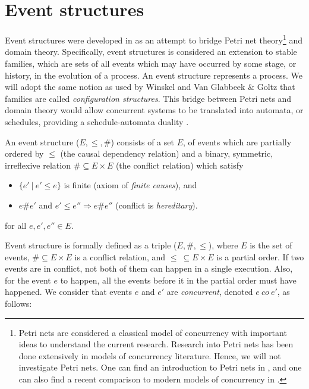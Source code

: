 \section{Event structures}
\label{sec:event-structures}
    Event structures were developed in \cite{winskel80events} as an attempt to bridge Petri net theory\footnote{Petri nets are considered a classical model of concurrency with important ideas to understand the current research. Research into Petri nets has been done extensively in models of concurrency literature. Hence, we will not investigate Petri nets. One can find an introduction to Petri nets in \cite{Petri73petrinets}, and one can also find a recent comparison to modern models of concurrency in \cite{Goubault18RelationshipsModelsForConcurrency}.} and domain theory. Specifically, event structures is considered an extension to stable families, which are sets of all events which may have occurred by some stage, or history, in the evolution of a process. An event structure represents a process. We will adopt the same notion as used by Winskel \cite{NielsenPW81eventstructures} and Van Glabbeek $\&$ Goltz \cite{GlabbeekP09configStruct} that families are called \emph{configuration structures}. This bridge between Petri nets and domain theory would allow concurrent systems to be translated into automata, or schedules, providing a schedule-automata duality \cite{NielsenPW81eventstructures, GlabbeekP09configStruct}.

 \begin{definition}\label{def:event-structure}
    An event structure ($E, \leq, \#$) consists of a set $E$, of events which are partially ordered by $\leq$ (the causal dependency relation) and a binary, symmetric, irreflexive relation $\# \subseteq E \times E$ (the conflict relation) which satisfy
    
    \begin{itemize}
        \item $\{ e'\ |\ e' \leq e\}$ is finite (axiom of \emph{finite causes}), and
        \item $e \# e'$ and $ e' \leq e'' \Rightarrow e \# e''$ (conflict is \emph{hereditary}).
    \end{itemize}
    
    for all $e, e', e'' \in E$.
\end{definition}

Event structure is formally defined as a triple ($E, \#, \leq$), where $E$ is the set of events, $\# \subseteq E \times E$ is a conflict relation, and $\leq\ \subseteq E \times E$ is a partial order. If two events are in conflict, not both of them can happen in a single execution. Also, for the event $e$ to happen, all the events before it in the partial order must have happened. We consider that events $e$ and $e'$ are \emph{concurrent}, denoted $e\ co\ e'$, as follows:

